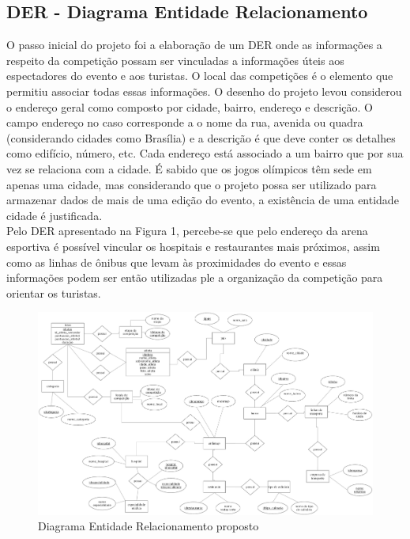 \documentclass[10pt]{article}
\begin{document}
\begin{multicols}{2}
\subsection{DER - Diagrama Entidade Relacionamento}
O passo inicial do projeto foi a elaboração de  um DER onde as informações a respeito da competição possam ser vinculadas a informações úteis aos espectadores do evento e aos turistas. O local das competições é o elemento que permitiu associar todas essas informações. O desenho do projeto levou considerou o endereço geral como composto por cidade, bairro, endereço e descrição. O campo endereço no caso corresponde a o nome da rua, avenida ou quadra (considerando cidades como Brasília) e a descrição é que deve conter os detalhes como edifício, número, etc. Cada endereço está associado a um bairro que por sua vez se relaciona com  a cidade. É sabido que os jogos olímpicos têm sede em apenas uma cidade, mas considerando que o projeto possa ser utilizado para armazenar dados de mais de uma edição do evento, a existência de uma entidade cidade é justificada.\\ Pelo DER apresentado na Figura 1, percebe-se que pelo endereço da arena esportiva é possível vincular os hospitais e restaurantes mais próximos, assim como as linhas de ônibus que levam às proximidades do evento e essas informações podem ser então utilizadas ple a organização da competição para orientar os turistas. 

\end{multicols}

\begin{center}
\begin{figure}[h]
\includegraphics[scale=0.13]{der.jpg}
\caption{ Diagrama Entidade Relacionamento proposto}
\end{figure}
\end{center}
\end{document}
